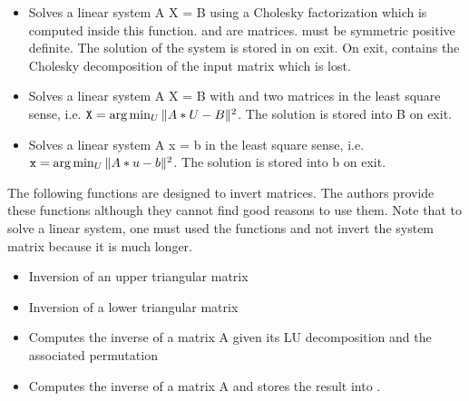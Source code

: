 \begin{itemize}
\item {}
  \sshortdescribe Solves a linear system A X = B
  using a Cholesky factorization which is computed inside this
  function.  and  are matrices.  must be symmetric
  positive definite. The solution of the system is stored in  on
  exit. On exit,  contains the Cholesky decomposition of the input
  matrix which is lost.

\item {}
  \sshortdescribe Solves a linear system A X = B with  and  two
  matrices in the least square sense, i.e. ${\tt X} = \arg\min_U \| A * U -
  B\|^2$. The solution is stored into B on exit.

\item {}
  \sshortdescribe Solves a linear system A x = b in the least square sense,
  i.e. ${\tt x} = \arg\min_U \| A * u - b\|^2$. The solution is stored into b
  on exit.
\end{itemize}


The following functions are designed to invert matrices. The authors provide
these functions although they cannot find good reasons to use them. Note that
to solve a linear system, one must used the  functions and not
invert the system matrix because it is much longer.
\begin{itemize}
\item {}
  \sshortdescribe Inversion of an upper triangular matrix  

\item {}
  \sshortdescribe Inversion of a lower triangular matrix  

\item {} 
  \sshortdescribe Computes the inverse of a matrix A given its LU
  decomposition and the associated permutation   

\item {}
  \sshortdescribe Computes the inverse of a matrix A and stores the result
  into .
\end{itemize}


